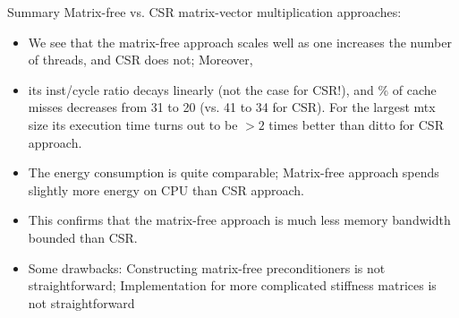 \documentclass[svgnames]{beamer} %
\begin{document}
	\begin{frame}{Summary}
		Matrix-free vs. CSR matrix-vector multiplication approaches: 
		\begin{itemize}
			\item We see that the matrix-free approach scales well as one increases the number of threads, and CSR does not; Moreover,
			\item its inst/cycle ratio decays linearly (not the case for CSR!), and \% of cache misses decreases from 31 to 20 (vs. 41 to 34 for CSR). For the largest mtx size its execution time turns out to be $>2$ times better than ditto for CSR approach.
			\item The energy consumption is quite comparable; Matrix-free approach spends slightly more energy on CPU than CSR approach.
			\item This confirms that the matrix-free approach is much less memory bandwidth bounded than CSR.
			\item Some drawbacks: Constructing matrix-free preconditioners is not straightforward; Implementation for more complicated stiffness matrices is not straightforward
		\end{itemize}
	\end{frame}
	
\end{document}
